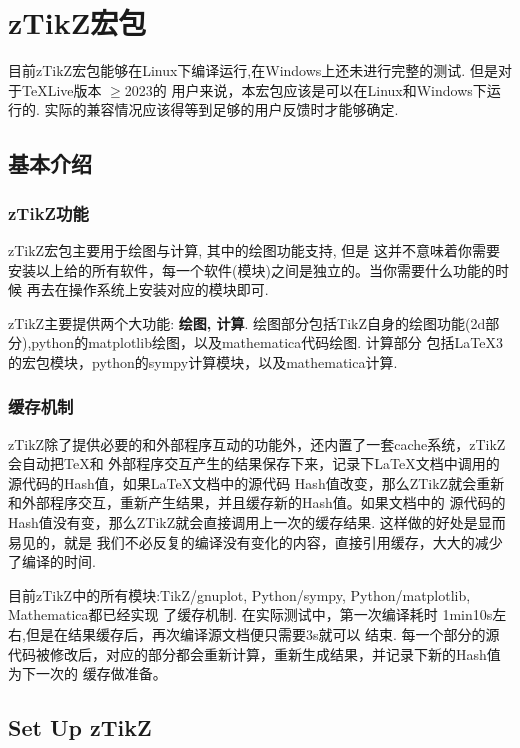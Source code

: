 \chapter{zTikZ{}宏包}
目前zTikZ宏包能够在Linux下编译运行,在Windows上还未进行完整的测试. 但是对于\TeX{}Live版本 $\ge$2023的
用户来说，本宏包应该是可以在Linux和Windows下运行的. 实际的兼容情况应该得等到足够的用户反馈时才能够确定.

\section{基本介绍}
\subsection{zTikZ{}功能}
zTikZ宏包主要用于绘图与计算, 其中的绘图功能支持, 但是
这并不意味着你需要安装以上给的所有软件，每一个软件(模块)之间是独立的。当你需要什么功能的时候
再去在操作系统上安装对应的模块即可.

zTikZ主要提供两个大功能: \textbf{绘图, 计算}.
绘图部分包括TikZ自身的绘图功能(2d部分),python的matplotlib绘图，以及mathematica代码绘图. 计算部分
包括\LaTeX3的宏包模块，python的sympy计算模块，以及mathematica计算. 

\subsection{缓存机制}
zTikZ除了提供必要的和外部程序互动的功能外，还内置了一套cache系统，zTikZ会自动把\TeX{}和
外部程序交互产生的结果保存下来，记录下\LaTeX{}文档中调用的源代码的Hash值，如果\LaTeX{}文档中的源代码
Hash值改变，那么ZTikZ就会重新和外部程序交互，重新产生结果，并且缓存新的Hash值。如果文档中的
源代码的Hash值没有变，那么ZTikZ就会直接调用上一次的缓存结果. 这样做的好处是显而易见的，就是
我们不必反复的编译没有变化的内容，直接引用缓存，大大的减少了编译的时间. 

目前zTikZ中的所有模块:TikZ/gnuplot, Python/sympy, Python/matplotlib, Mathematica都已经实现
了缓存机制. 在实际测试中，第一次编译耗时 1min10s左右,但是在结果缓存后，再次编译源文档便只需要3s就可以
结束. 每一个部分的源代码被修改后，对应的部分都会重新计算，重新生成结果，并记录下新的Hash值为下一次的
缓存做准备。

\section{Set Up zTikZ}
